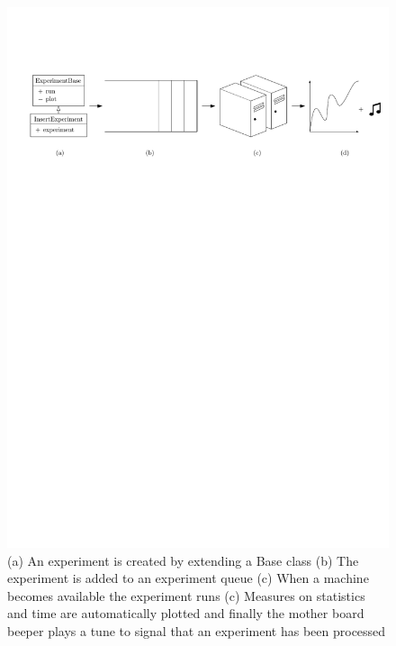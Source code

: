 \documentclass[twoside,11pt,openright]{report}
\begin{document}
\begin{figure}[h]
	\centering
	\includegraphics[width=\textwidth]{../figures/experimental_setup3}
	\caption{(a) An experiment is created by extending a Base class (b) The experiment is added to an experiment queue (c) When a machine becomes available the experiment runs (c) Measures on statistics and time are automatically plotted and finally the mother board beeper plays a tune to signal that an experiment has been processed}
	\label{fig:experimental_setup2}
\end{figure}
\end{document}
